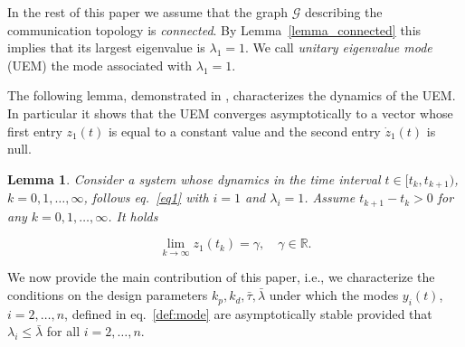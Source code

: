\documentclass[conference]{IEEEtran}
\newcommand{\rea}{\mathbb{R}}
\newtheorem{lemma}[theorem]{\textbf{Lemma}}
\begin{document}
In the rest of this paper we assume that the graph $\mathcal{G}$ describing the communication topology is {\em connected}. By Lemma~\ref{lemma_connected} this implies that its largest eigenvalue is $\lambda_1=1$. We call \emph{unitary eigenvalue mode} (UEM) the mode associated with $\lambda_1=1$.




The following lemma, demonstrated in \cite{ETFA2014}, characterizes the dynamics of the UEM. In particular it shows that the UEM converges asymptotically to a vector whose first entry $z_1(t)$ is equal to a constant value and the second entry $\dot z_1(t)$ is null.

\begin{lemma}\label{lemma1}
Consider a system whose dynamics in the time interval $t\in [t_k,t_{k+1})$, $k=0,1,\ldots,\infty$, follows eq.~\eqref{eq1} with $i=1$ and $\lambda_i=1$. Assume $t_{k+1}-t_k>0$ for any $k=0,1,\ldots,\infty$. It holds

\begin{equation}
\lim_{k\rightarrow\infty} z_1(t_k)=\gamma, \quad \gamma \in \rea.
\end{equation}
\end{lemma}



We now provide the main contribution of this paper, i.e., we characterize the conditions on the design parameters $k_p, k_d, \bar \tau,\bar \lambda$ under which the modes $y_i(t)$, $i=2,\ldots,n$, defined in eq.~\eqref{def:mode} are asymptotically stable provided that $\lambda_i \leq \bar \lambda$ for all $i=2,\ldots,n$.
\end{document}
